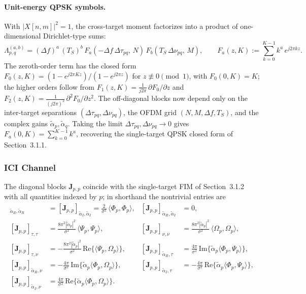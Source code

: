 \documentclass[11pt]{article}
\begin{document}
\paragraph{Unit-energy QPSK symbols.} With \(|X[n,m]|^2 = 1\), the cross-target moment factorizes into a product of one-dimensional Dirichlet-type sums:
\begin{equation}
    \Lambda_{p,q}^{(a,b)} = (\Delta f)^a\, (T_S)^b\, F_a\!\left(-\Delta f\, \Delta\tau_{pq},\, N\right)\, F_b\!\left(T_S\, \Delta\nu_{pq},\, M\right), \qquad F_a(z, K) := \sum_{k=0}^{K-1} k^a\, e^{j2\pi k z}.
\end{equation}
The zeroth-order term has the closed form \(F_0(z, K) = (1 - e^{j2\pi K z})/(1 - e^{j2\pi z})\) for \(z \not\equiv 0 \pmod 1\), with \(F_0(0, K) = K\); the higher orders follow from \(F_1(z,K) = \tfrac{1}{j2\pi}\, \partial F_0 / \partial z\) and \(F_2(z,K) = \tfrac{1}{(j2\pi)^2}\, \partial^2 F_0 / \partial z^2\). The off-diagonal blocks now depend only on the inter-target separations \((\Delta\tau_{pq}, \Delta\nu_{pq})\), the OFDM grid \((N, M, \Delta f, T_S)\), and the complex gains \(\tilde{\alpha}_p, \tilde{\alpha}_q\). Taking the limit \(\Delta\tau_{pq}, \Delta\nu_{pq} \to 0\) gives \(F_a(0,K) = \sum_{k=0}^{K-1} k^a\), recovering the single-target QPSK closed form of Section~3.1.1.

\subsubsection{ICI Channel}

The diagonal blocks \(\bm{J}_{p,p}\) coincide with the single-target FIM of Section~3.1.2 with all quantities indexed by \(p\); in shorthand the nontrivial entries are
\begin{align}
    [\bm{J}_{p,p}]_{\tilde{\alpha}_R,\tilde{\alpha}_R} &= [\bm{J}_{p,p}]_{\tilde{\alpha}_I,\tilde{\alpha}_I} = \tfrac{2}{\sigma^2}\, \langle \Phi_p,\Phi_p \rangle, &
    [\bm{J}_{p,p}]_{\tilde{\alpha}_R,\tilde{\alpha}_I} &= 0, \\
    [\bm{J}_{p,p}]_{\tau,\tau} &= \tfrac{8\pi^2 |\tilde{\alpha}_p|^2}{\sigma^2}\, \langle \Psi_p,\Psi_p \rangle, &
    [\bm{J}_{p,p}]_{\nu,\nu} &= \tfrac{8\pi^2 |\tilde{\alpha}_p|^2}{\sigma^2}\, \langle \Omega_p,\Omega_p \rangle, \\
    [\bm{J}_{p,p}]_{\tau,\nu} &= -\tfrac{8\pi^2 |\tilde{\alpha}_p|^2}{\sigma^2}\, \text{Re}\{ \langle \Psi_p,\Omega_p \rangle \}, &
    [\bm{J}_{p,p}]_{\tilde{\alpha}_R,\tau} &= \tfrac{4\pi}{\sigma^2}\, \text{Im}\{ \tilde{\alpha}_p \langle \Phi_p,\Psi_p \rangle \}, \\
    [\bm{J}_{p,p}]_{\tilde{\alpha}_R,\nu} &= -\tfrac{4\pi}{\sigma^2}\, \text{Im}\{ \tilde{\alpha}_p \langle \Phi_p,\Omega_p \rangle \}, &
    [\bm{J}_{p,p}]_{\tilde{\alpha}_I,\tau} &= -\tfrac{4\pi}{\sigma^2}\, \text{Re}\{ \tilde{\alpha}_p \langle \Phi_p,\Psi_p \rangle \}, \\
    [\bm{J}_{p,p}]_{\tilde{\alpha}_I,\nu} &= \tfrac{4\pi}{\sigma^2}\, \text{Re}\{ \tilde{\alpha}_p \langle \Phi_p,\Omega_p \rangle \}. & &
\end{align}
\end{document}
